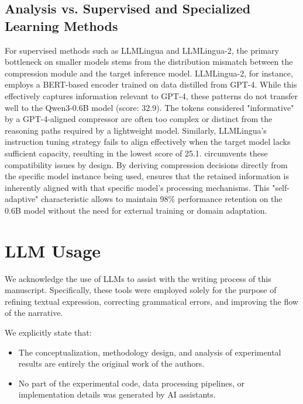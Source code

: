 \documentclass[11pt]{article}
\newcommand{\ours}{\text{BEAVER}\xspace}
\begin{document}
\subsection{Analysis vs. Supervised and Specialized Learning Methods}
For supervised methods such as LLMLingua and LLMLingua-2, the primary bottleneck on smaller models stems from the distribution mismatch between the compression module and the target inference model. LLMLingua-2, for instance, employs a BERT-based encoder trained on data distilled from GPT-4. While this effectively captures information relevant to GPT-4, these patterns do not transfer well to the Qwen3-0.6B model (score: 32.9). The tokens considered "informative" by a GPT-4-aligned compressor are often too complex or distinct from the reasoning paths required by a lightweight model. Similarly, LLMLingua's instruction tuning strategy fails to align effectively when the target model lacks sufficient capacity, resulting in the lowest score of 25.1. \ours circumvents these compatibility issues by design. By deriving compression decisions directly from the specific model instance being used, \ours ensures that the retained information is inherently aligned with that specific model's processing mechanisms. This "self-adaptive" characteristic allows \ours to maintain 98\% performance retention on the 0.6B model without the need for external training or domain adaptation.

\section{LLM Usage}
\label{appendix:llm_usage}

We acknowledge the use of LLMs to assist with the writing process of this manuscript. Specifically, these tools were employed solely for the purpose of refining textual expression, correcting grammatical errors, and improving the flow of the narrative.

We explicitly state that:
\begin{itemize}
    \item The conceptualization, methodology design, and analysis of experimental results are entirely the original work of the authors.
    \item No part of the experimental code, data processing pipelines, or implementation details was generated by AI assistants.
\end{itemize}
\end{document}
